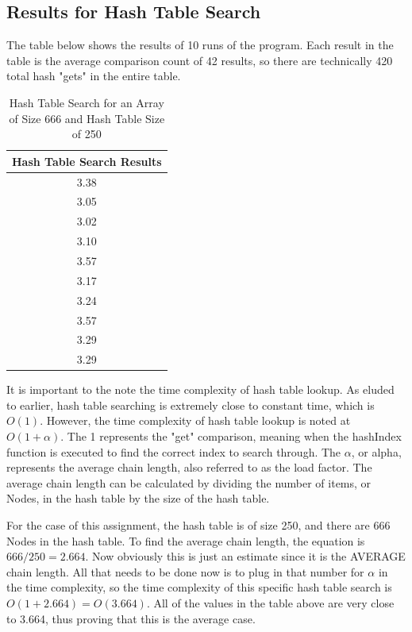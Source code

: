 \documentclass[letterpaper, 10pt]{article}
\begin{document}
\subsection{Results for Hash Table Search}
\noindent
The table below shows the results of 10 runs of the program. Each result in the table is the average comparison count of 42 results, so there are technically 420 total hash "gets" in the entire table.

\begin{table}[H]
    \centering
    \begin{tabular}{|c|}
        \hline
        \textbf{Hash Table Search Results} \\ \hline
        3.38 \\ 
        3.05 \\ 
        3.02 \\ 
        3.10 \\ 
        3.57 \\ 
        3.17 \\ 
        3.24 \\ 
        3.57 \\ 
        3.29 \\ 
        3.29 \\ \hline
    \end{tabular}
    \caption{Hash Table Search for an Array of Size 666 and Hash Table Size of 250}
    \label{tab:tab3}
\end{table}

\noindent
It is important to the note the time complexity of hash table lookup. As eluded to earlier, hash table searching is extremely close to constant time, which is $O(1)$. However, the time complexity of hash table lookup is noted at $O(1 + \alpha)$. The 1 represents the "get" comparison, meaning when the hashIndex function is executed to find the correct index to search through. The $\alpha$, or alpha, represents the average chain length, also referred to as the load factor. The average chain length can be calculated by dividing the number of items, or Nodes, in the hash table by the size of the hash table.   

\vspace{1em}

\noindent
For the case of this assignment, the hash table is of size 250, and there are 666 Nodes in the hash table. To find the average chain length, the equation is $666/250 = 2.664$. Now obviously this is just an estimate since it is the AVERAGE chain length. All that needs to be done now is to plug in that number for $\alpha$ in the time complexity, so the time complexity of this specific hash table search is $O(1 + 2.664) = O(3.664)$. All of the values in the table above are very close to 3.664, thus proving that this is the average case.
\end{document}
